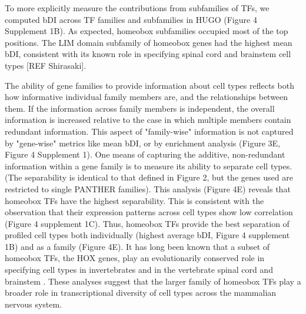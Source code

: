 To more explicitly measure the contributions from subfamilies of TFs, we computed bDI across TF families and subfamilies in HUGO (Figure 4 Supplement 1B). As expected, homeobox subfamilies occupied most of the top positions. The LIM domain subfamily of homeobox genes had the highest mean bDI, consistent with its known role in specifying spinal cord and brainstem cell types [REF Shirasaki]. 

The ability of gene families to provide information about cell types reflects both how informative individual family members are, and the relationships between them. If the information across family members is independent, the overall information is increased relative to the case in which multiple members contain redundant information. This aspect of "family-wise" information is not captured by "gene-wise" metrics like mean bDI, or by enrichment analysis (Figure 3E, Figure 4 Supplement 1). One means of capturing the additive, non-redundant information within a gene family is to measure its ability to separate cell types. (The separability is identical to that defined in Figure 2, but the genes used are restricted to single PANTHER families). This analysis (Figure 4E) reveals that homeobox TFs have the highest separability. This is consistent with the observation that their expression patterns across cell types show low correlation (Figure 4 supplement 1C). Thus, homeobox TFs provide the best separation of profiled cell types both individually (highest average bDI, Figure 4 supplement 1B) and as a family (Figure 4E). It has long been known that a subset of homeobox TFs, the HOX genes, play an evolutionarily conserved role in specifying cell types in invertebrates \cite{Kratsios_2017} \cite{Zheng_2015} and in the vertebrate spinal cord and brainstem \cite{Dasen_2009,Philippidou_2013}. These analyses suggest that the larger family of homeobox TFs play a broader role in transcriptional diversity of cell types across the mammalian nervous system.
